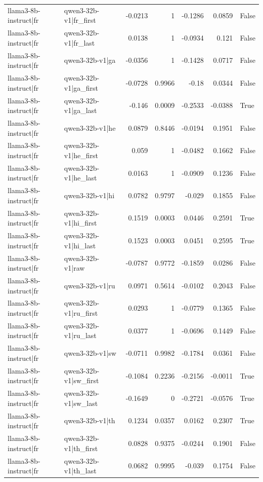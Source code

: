 \begin{table}
\begin{tabular}{l l r r r r l}
llama3-8b-instruct|fr & qwen3-32b-v1|fr_first & -0.0213 & 1 & -0.1286 & 0.0859 & False \\
llama3-8b-instruct|fr & qwen3-32b-v1|fr_last & 0.0138 & 1 & -0.0934 & 0.121 & False \\
llama3-8b-instruct|fr & qwen3-32b-v1|ga & -0.0356 & 1 & -0.1428 & 0.0717 & False \\
llama3-8b-instruct|fr & qwen3-32b-v1|ga_first & -0.0728 & 0.9966 & -0.18 & 0.0344 & False \\
llama3-8b-instruct|fr & qwen3-32b-v1|ga_last & -0.146 & 0.0009 & -0.2533 & -0.0388 & True \\
llama3-8b-instruct|fr & qwen3-32b-v1|he & 0.0879 & 0.8446 & -0.0194 & 0.1951 & False \\
llama3-8b-instruct|fr & qwen3-32b-v1|he_first & 0.059 & 1 & -0.0482 & 0.1662 & False \\
llama3-8b-instruct|fr & qwen3-32b-v1|he_last & 0.0163 & 1 & -0.0909 & 0.1236 & False \\
llama3-8b-instruct|fr & qwen3-32b-v1|hi & 0.0782 & 0.9797 & -0.029 & 0.1855 & False \\
llama3-8b-instruct|fr & qwen3-32b-v1|hi_first & 0.1519 & 0.0003 & 0.0446 & 0.2591 & True \\
llama3-8b-instruct|fr & qwen3-32b-v1|hi_last & 0.1523 & 0.0003 & 0.0451 & 0.2595 & True \\
llama3-8b-instruct|fr & qwen3-32b-v1|raw & -0.0787 & 0.9772 & -0.1859 & 0.0286 & False \\
llama3-8b-instruct|fr & qwen3-32b-v1|ru & 0.0971 & 0.5614 & -0.0102 & 0.2043 & False \\
llama3-8b-instruct|fr & qwen3-32b-v1|ru_first & 0.0293 & 1 & -0.0779 & 0.1365 & False \\
llama3-8b-instruct|fr & qwen3-32b-v1|ru_last & 0.0377 & 1 & -0.0696 & 0.1449 & False \\
llama3-8b-instruct|fr & qwen3-32b-v1|sw & -0.0711 & 0.9982 & -0.1784 & 0.0361 & False \\
llama3-8b-instruct|fr & qwen3-32b-v1|sw_first & -0.1084 & 0.2236 & -0.2156 & -0.0011 & True \\
llama3-8b-instruct|fr & qwen3-32b-v1|sw_last & -0.1649 & 0 & -0.2721 & -0.0576 & True \\
llama3-8b-instruct|fr & qwen3-32b-v1|th & 0.1234 & 0.0357 & 0.0162 & 0.2307 & True \\
llama3-8b-instruct|fr & qwen3-32b-v1|th_first & 0.0828 & 0.9375 & -0.0244 & 0.1901 & False \\
llama3-8b-instruct|fr & qwen3-32b-v1|th_last & 0.0682 & 0.9995 & -0.039 & 0.1754 & False \\

\end{tabular}
\end{table}
